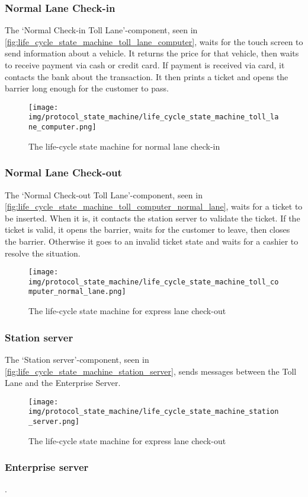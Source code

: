 \subsubsection*{Normal Lane Check-in}
The ‘Normal Check-in Toll Lane’-component, seen in \autoref{fig:life_cycle_state_machine_toll_lane_computer}, waits for the touch screen to send information about a vehicle. It returns the price for that vehicle, then waits to receive payment via cash or credit card. If payment is received via card, it contacts the bank about the transaction. It then prints a ticket and opens the barrier long enough for the customer to pass.
\begin{figure}[H]
\centering
\texttt{[image: img/protocol\_state\_machine/life\_cycle\_state\_machine\_toll\_lane\_computer.png]}
\caption{The life-cycle state machine for normal lane check-in}
\label{fig:life_cycle_state_machine_toll_lane_computer}
\end{figure}

\subsubsection*{Normal Lane Check-out}
The ‘Normal Check-out Toll Lane’-component, seen in \autoref{fig:life_cycle_state_machine_toll_computer_normal_lane}, waits for a ticket to be inserted. When it is, it contacts the station server to validate the ticket. If the ticket is valid, it opens the barrier, waits for the customer to leave, then closes the barrier. Otherwise it goes to an invalid ticket state and waits for a cashier to resolve the situation.
\begin{figure}[H]
\centering
\texttt{[image: img/protocol\_state\_machine/life\_cycle\_state\_machine\_toll\_computer\_normal\_lane.png]}
\caption{The life-cycle state machine for express lane check-out}
\label{fig:life_cycle_state_machine_toll_computer_normal_lane}
\end{figure}

\subsubsection*{Station server}
The ‘Station server’-component, seen in \autoref{fig:life_cycle_state_machine_station_server}, sends messages between the Toll Lane and the Enterprise Server.
\begin{figure}[H]
\centering
\texttt{[image: img/protocol\_state\_machine/life\_cycle\_state\_machine\_station\_server.png]}
\caption{The life-cycle state machine for express lane check-out}
\label{fig:life_cycle_state_machine_station_server}
\end{figure}


\subsubsection*{Enterprise server}
.